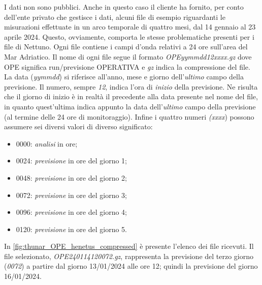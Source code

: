 \documentclass[./main.tex]{subfiles}
\begin{document}
I dati non sono pubblici. Anche in questo caso il cliente ha fornito, per conto dell'ente privato che gestisce i dati, alcuni file di esempio riguardanti le misurazioni effettuate in un arco temporale di quattro mesi, dal 14 gennaio al 23 aprile 2024. Questo, ovviamente, comporta le stesse problematiche presenti per i file di Nettuno. Ogni file contiene i campi d'onda relativi a 24 ore sull'area del Mar Adriatico. Il nome di ogni file segue il formato \textit{OPEyymmdd12xxxx.gz} dove OPE significa run/previsione OPERATIVA e \textit{gz} indica la compressione del file. La data (\textit{yymmdd}) si riferisce all'anno, mese e giorno dell'\textit{ultimo} campo della previsione. Il numero, sempre \textit{12}, indica l'ora di \textit{inizio} della previsione.  Ne risulta che il giorno di inizio è in realtà il precedente alla data presente nel nome del file, in quanto quest'ultima indica appunto la data dell'\textit{ultimo} campo della previsione (al termine delle 24 ore di monitoraggio). Infine i quattro numeri \textit{(xxxx}) possono assumere sei diversi valori di diverso significato:
\begin{itemize}
    \item 0000: \textit{analisi} in ore;
    \item 0024: \textit{previsione} in ore del giorno 1;
    \item 0048: \textit{previsione} in ore del giorno 2;
    \item 0072: \textit{previsione} in ore del giorno 3;
    \item 0096: \textit{previsione} in ore del giorno 4;
    \item 0120: \textit{previsione} in ore del giorno 5.
\end{itemize}

In \autoref{fig:thunar_OPE_henetus_compressed} è presente l'elenco dei file ricevuti. Il file selezionato, \textit{OPE240114120072.gz}, rappresenta la previsione del terzo giorno (\textit{0072}) a partire dal giorno 13/01/2024 alle ore 12; quindi la previsione del giorno 16/01/2024.
\end{document}
